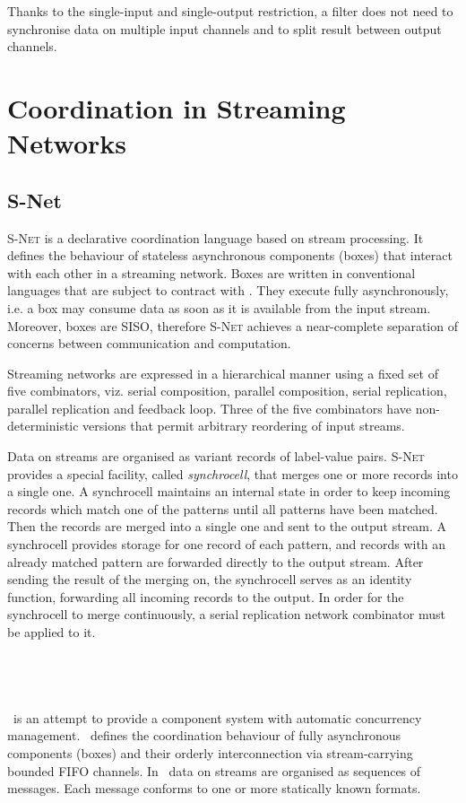 Thanks to the single-input and single-output restriction, a filter does not need to synchronise data on multiple input channels and to split result between output channels.


\section{Coordination in Streaming Networks}

    \subsection{S-Net}
\textsc{S-Net} \cite{snet_intro} is a declarative coordination language based on stream processing. It defines the behaviour of stateless asynchronous components (boxes) that interact with each other in a streaming network. Boxes are written in conventional languages that are subject to contract with . They execute fully asynchronously, i.e. a box may consume data as soon as it is available from the input stream. Moreover, boxes are SISO, therefore \textsc{S-Net} achieves a near-complete separation of concerns between communication and computation.

Streaming networks are expressed in a hierarchical manner using a fixed set of five combinators, viz. serial composition, parallel composition, serial replication, parallel replication and feedback loop. Three of the five combinators have non-deterministic versions that permit arbitrary reordering of input streams.

Data on streams are organised as variant records of label-value pairs. \textsc{S-Net} provides a special facility, called \emph{synchrocell}, that merges one or more records into a single one. A synchrocell maintains an internal state in order to keep incoming records which match one of the patterns until all patterns have been matched. Then the records are merged into a single one and sent to the output stream. A synchrocell provides storage for one record of each pattern, and records with an already matched pattern are forwarded directly to the output stream. After sending the result of the merging on, the synchrocell serves as an identity function, forwarding all incoming records to the output. In order for the synchrocell to merge continuously, a serial replication network combinator must be applied to it.


    \subsection{\ak\ }
\ak\ is an attempt to provide a component system with automatic concurrency management. \ak\ defines the coordination behaviour of fully asynchronous components (boxes) and their orderly interconnection via stream-carrying bounded FIFO channels. In \ak\, data on streams are organised as sequences of messages. Each message conforms to one or more statically known formats.

